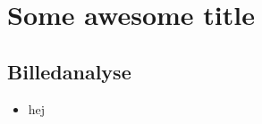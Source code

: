 \section{Some awesome title}

\subsection{Billedanalyse}
\begin{frame}
\begin{itemize}
\item hej
\end{itemize}
\end{frame}